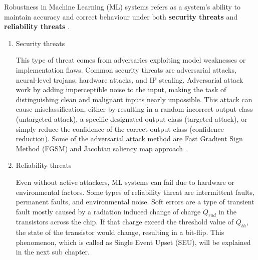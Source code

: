 \documentclass[ %
                    author={Revalda Putawara},
                supervisor={Dr. James Pope},
                    degree={MSc},
                     title={Robustness of Bayesian Neural Networks Design Choices Against Weight and Bias Perturbation Induced by Single Event Upsets (SEUs)},
                      type={},
                      year={2025}]{dissertation}
\begin{document}

Robustness in Machine Learning (ML) systems refers as a system's ability to maintain accuracy and correct behaviour under both \textbf{security threats} and \textbf{reliability threats} \cite{shafique_2021}.

\begin{enumerate}
\item Security threats

This type of threat comes from adversaries exploiting model weaknesses or implementation flaws. Common security threats are adversarial attacks, neural-level trojans, hardware attacks, and IP stealing. Adversarial attack work by adding imperceptible noise to the input, making the task of distinguishing clean and malignant inputs nearly impossible. This attack can cause misclassification, either by resulting in a random incorrect output class (untargeted attack), a specific designated output class (targeted attack), or simply reduce the confidence of the correct output class (confidence reduction). Some of the adversarial attack method are Fast Gradient Sign Method (FGSM) \cite{goodfellow2014explaining} and Jacobian saliency map approach \cite{2018-cs.LG-Wiyatno-Maximal}.

\item Reliability threats

Even without active attackers, ML systems can fail due to hardware or environmental factors. Some types of reliability threat are intermittent faults, permanent faults, and environmental noise. Soft errors are a type of transient fault mostly caused by a radiation induced change of  charge $Q_{rad}$ in the transistors across the chip. If that charge exceed the threshold value of $Q_{th}$, the state of the transistor would change, resulting in a bit-flip. This phenomenon, which is called as Single Event Upset (SEU), will be explained in the next sub chapter.


\end{enumerate}
\end{document}
